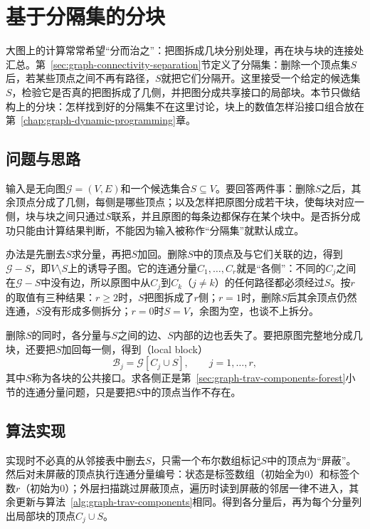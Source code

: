 \section{基于分隔集的分块}
\label{sec:graph-separator-blocks}

大图上的计算常常希望“分而治之”：把图拆成几块分别处理，再在块与块的连接处汇总。第~\ref{sec:graph-connectivity-separation}节定义了分隔集：删除一个顶点集$S$后，若某些顶点之间不再有路径，$S$就把它们分隔开。这里接受一个给定的候选集$S$，检验它是否真的把图拆成了几侧，并把图分成共享接口的局部块。本节只做结构上的分块：怎样找到好的分隔集不在这里讨论，块上的数值怎样沿接口组合放在第~\ref{chap:graph-dynamic-programming}章。

\subsection{问题与思路}
\label{sec:graph-trav-delete-separator}

输入是无向图$\mathcal G=(V,E)$和一个候选集合$S\subseteq V$。要回答两件事：删除$S$之后，其余顶点分成了几侧，每侧是哪些顶点；以及怎样把原图分成若干块，使每块对应一侧，块与块之间只通过$S$联系，并且原图的每条边都保存在某个块中。是否拆分成功只能由计算结果判断，不能因为输入被称作“分隔集”就默认成立。

办法是先删去$S$求分量，再把$S$加回。删除$S$中的顶点及与它们关联的边，得到$\mathcal G-S$，即$V\setminus S$上的诱导子图。它的连通分量$C_1,\ldots,C_r$就是“各侧”：不同的$C_j$之间在$\mathcal G-S$中没有边，所以原图中从$C_j$到$C_k$（$j\neq k$）的任何路径都必须经过$S$。按$r$的取值有三种结果：$r\geq2$时，$S$把图拆成了$r$侧；$r=1$时，删除$S$后其余顶点仍然连通，$S$没有形成多侧拆分；$r=0$时$S=V$，余图为空，也谈不上拆分。

删除$S$的同时，各分量与$S$之间的边、$S$内部的边也丢失了。要把原图完整地分成几块，还要把$S$加回每一侧，得到（local block）
\[
\mathcal B_j=\mathcal G[C_j\cup S],\qquad j=1,\ldots,r,
\]
其中$S$称为各块的公共接口。求各侧正是第~\ref{sec:graph-trav-components-forest}小节的连通分量问题，只是要把$S$中的顶点当作不存在。

\subsection{算法实现}
\label{sec:graph-trav-separator-implementation}

实现时不必真的从邻接表中删去$S$，只需一个布尔数组标记$S$中的顶点为“屏蔽”。然后对未屏蔽的顶点执行连通分量编号：状态是标签数组（初始全为$0$）和标签个数$r$（初始为$0$）；外层扫描跳过屏蔽顶点，遍历时读到屏蔽的邻居一律不进入，其余更新与算法~\ref{alg:graph-trav-components}相同。得到各分量后，再为每个分量列出局部块的顶点$C_j\cup S$。

